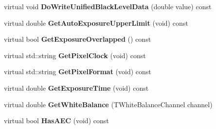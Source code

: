 \begin{DoxyCompactItemize}
\item 
\hypertarget{class_wizard_quick_setup_device_specific_ac50aa55d72f7f799929add3ecbea74e5}{virtual void {\bfseries Do\+Write\+Unified\+Black\+Level\+Data} (double value) const }\label{class_wizard_quick_setup_device_specific_ac50aa55d72f7f799929add3ecbea74e5}

\item 
\hypertarget{class_wizard_quick_setup_device_specific_a16a985661067d5868dc40005d2e71494}{virtual double {\bfseries Get\+Auto\+Exposure\+Upper\+Limit} (void) const }\label{class_wizard_quick_setup_device_specific_a16a985661067d5868dc40005d2e71494}

\item 
\hypertarget{class_wizard_quick_setup_device_specific_ac7faeafab05cd373b027e8f71b4efe62}{virtual bool {\bfseries Get\+Exposure\+Overlapped} () const }\label{class_wizard_quick_setup_device_specific_ac7faeafab05cd373b027e8f71b4efe62}

\item 
\hypertarget{class_wizard_quick_setup_device_specific_afd2574bac873caf0c4a0905b6d50f480}{virtual std\+::string {\bfseries Get\+Pixel\+Clock} (void) const }\label{class_wizard_quick_setup_device_specific_afd2574bac873caf0c4a0905b6d50f480}

\item 
\hypertarget{class_wizard_quick_setup_device_specific_a00330ff2f019f77fb402d71df6eff8d6}{virtual std\+::string {\bfseries Get\+Pixel\+Format} (void) const }\label{class_wizard_quick_setup_device_specific_a00330ff2f019f77fb402d71df6eff8d6}

\item 
\hypertarget{class_wizard_quick_setup_device_specific_a2af9f6eae92e57a421669835fbbf0065}{virtual double {\bfseries Get\+Exposure\+Time} (void) const }\label{class_wizard_quick_setup_device_specific_a2af9f6eae92e57a421669835fbbf0065}

\item 
\hypertarget{class_wizard_quick_setup_device_specific_a0f0d4af94edecabfd2a1d1772a941373}{virtual double {\bfseries Get\+White\+Balance} (T\+White\+Balance\+Channel channel)}\label{class_wizard_quick_setup_device_specific_a0f0d4af94edecabfd2a1d1772a941373}

\item 
\hypertarget{class_wizard_quick_setup_device_specific_a2365bcb233c457c4e11c38f84d662e68}{virtual bool {\bfseries Has\+A\+E\+C} (void) const }\label{class_wizard_quick_setup_device_specific_a2365bcb233c457c4e11c38f84d662e68}


\end{DoxyCompactItemize}
